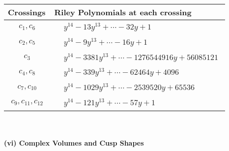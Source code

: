 \documentclass[1p]{elsarticle_modified}
\theoremstyle{definition}
\begin{document}
\begin{tabular}{m{50pt}|m{274pt}}
Crossings & \hspace{64pt}Riley Polynomials at each crossing \\
\hline $$\begin{aligned}c_{1},c_{6}\end{aligned}$$&$\begin{aligned}
&y^{14}-13 y^{13}+\cdots-32 y+1
\end{aligned}$\\
\hline $$\begin{aligned}c_{2},c_{5}\end{aligned}$$&$\begin{aligned}
&y^{14}-9 y^{13}+\cdots-16 y+1
\end{aligned}$\\
\hline $$\begin{aligned}c_{3}\end{aligned}$$&$\begin{aligned}
&y^{14}-3381 y^{13}+\cdots-1276544916 y+56085121
\end{aligned}$\\
\hline $$\begin{aligned}c_{4},c_{8}\end{aligned}$$&$\begin{aligned}
&y^{14}-339 y^{13}+\cdots-62464 y+4096
\end{aligned}$\\
\hline $$\begin{aligned}c_{7},c_{10}\end{aligned}$$&$\begin{aligned}
&y^{14}-1029 y^{13}+\cdots-2539520 y+65536
\end{aligned}$\\
\hline $$\begin{aligned}c_{9},c_{11},c_{12}\end{aligned}$$&$\begin{aligned}
&y^{14}-121 y^{13}+\cdots-57 y+1
\end{aligned}$\\
\hline
\end{tabular}\\~\\
\newpage\flushleft \textbf{(vi) Complex Volumes and Cusp Shapes}
\end{document}
